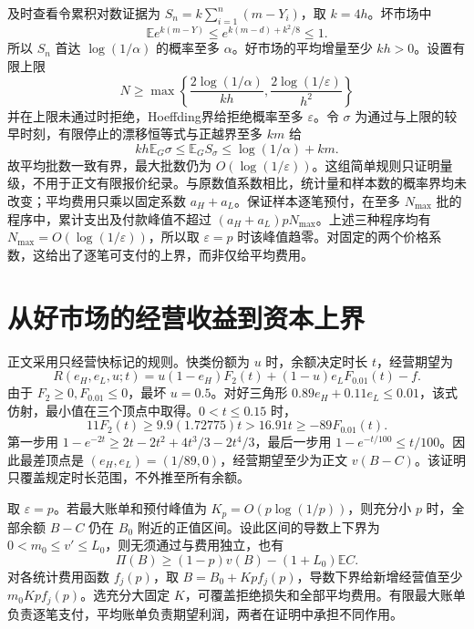 \documentclass[UTF8,fontset=windows,11pt,a4paper]{ctexart}
\numberwithin{equation}{section}
\begin{document}
及时查看令累积对数证据为 $S_n=k\sum_{i=1}^n(m-Y_i)$，取 $k=4h$。坏市场中
\begin{equation}
 \mathbb E e^{k(m-Y)}\le e^{k(m-d)+k^2/8}\le1.
\end{equation}
所以 $S_n$ 首达 $\log(1/\alpha)$ 的概率至多 $\alpha$。好市场的平均增量至少 $kh>0$。设置有限上限
\begin{equation}
 N\ge\max\left\{\frac{2\log(1/\alpha)}{kh},
                    \frac{2\log(1/\varepsilon)}{h^2}\right\}
\end{equation}
并在上限未通过时拒绝，Hoeffding界给拒绝概率至多 $\varepsilon$。令 $\sigma$ 为通过与上限的较早时刻，有限停止的漂移恒等式与正越界至多 $km$ 给
\begin{equation}
 kh\mathbb E_G\sigma\le\mathbb E_G S_\sigma
 \le\log(1/\alpha)+km.
\end{equation}
故平均批数一致有界，最大批数仍为 $O(\log(1/\varepsilon))$。这组简单规则只证明量级，不用于正文有限报价纪录。与原数值系数相比，统计量和样本数的概率界均未改变；平均费用只乘以固定系数 $a_H+a_L$。保证样本逐笔预付，在至多 $N_{\max}$ 批的程序中，累计支出及付款峰值不超过 $(a_H+a_L)pN_{\max}$。上述三种程序均有 $N_{\max}=O(\log(1/\varepsilon))$，所以取 $\varepsilon=p$ 时该峰值趋零。对固定的两个价格系数，这给出了逐笔可支付的上界，而非仅给平均费用。

\section{从好市场的经营收益到资本上界}
正文采用只经营快标记的规则。快类份额为 $u$ 时，余额决定时长 $t$，经营期望为
\begin{equation}
 R(e_H,e_L,u;t)=u(1-e_H)F_2(t)+(1-u)e_LF_{0.01}(t)-f.
\end{equation}
由于 $F_2\ge0,F_{0.01}\le0$，最坏 $u=0.5$。对好三角形 $0.89e_H+0.11e_L\le0.01$，该式仿射，最小值在三个顶点中取得。$0<t\le0.15$ 时，
\begin{equation}
 11F_2(t)\ge9.9(1.72775)t>16.91t\ge-89F_{0.01}(t).
\end{equation}
第一步用 $1-e^{-2t}\ge2t-2t^2+4t^3/3-2t^4/3$，最后一步用 $1-e^{-t/100}\le t/100$。因此最差顶点是 $(e_H,e_L)=(1/89,0)$，经营期望至少为正文 $v(B-C)$。该证明只覆盖规定时长范围，不外推至所有余额。

取 $\varepsilon=p$。若最大账单和预付峰值为 $K_p=O(p\log(1/p))$，则充分小 $p$ 时，全部余额 $B-C$ 仍在 $B_0$ 附近的正值区间。设此区间的导数上下界为 $0<m_0\le v'\le L_0$，则无须通过与费用独立，也有
\begin{equation}
 \Pi(B)\ge(1-p)v(B)-(1+L_0)\mathbb EC.
\end{equation}
对各统计费用函数 $f_j(p)$，取 $B=B_0+Kpf_j(p)$，导数下界给新增经营值至少 $m_0Kpf_j(p)$。选充分大固定 $K$，可覆盖拒绝损失和全部平均费用。有限最大账单负责逐笔支付，平均账单负责期望利润，两者在证明中承担不同作用。
\end{document}
